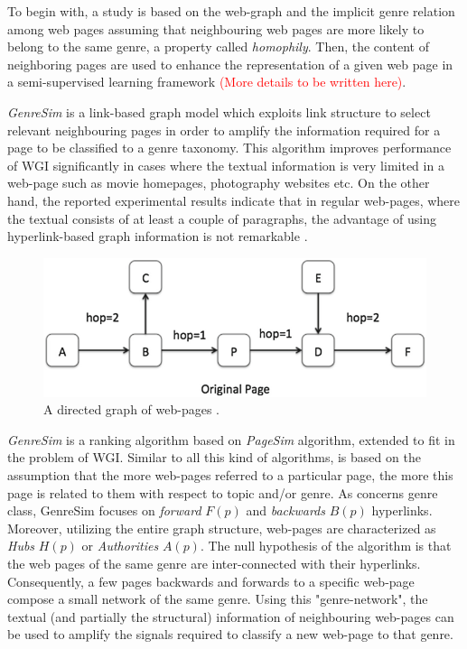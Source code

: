 To begin with, a study is based on the web-graph and the implicit genre relation among web pages assuming that neighbouring web pages are more likely to belong to the same genre, a property called \textit{homophily}. Then, the content of neighboring pages are used to enhance the representation of a given web page in a semi-supervised learning framework \parencite{asheghi2014semi} \textcolor{red}{(More details to be written here)}.

\textit{GenreSim} is a link-based graph model which exploits link structure to select relevant neighbouring pages in order to amplify the information required for a page to be classified to a genre taxonomy. This algorithm improves performance of WGI significantly in cases where the textual information is very limited in a web-page such as movie homepages, photography websites etc. On the other hand, the reported experimental results indicate that in regular web-pages, where the textual consists of at least a couple of paragraphs, the advantage of using hyperlink-based graph information is not remarkable \parencite{zhu2011enhance,zhu2016exploiting}.

\begin{figure}[t]
	\begin{center}
    	\includegraphics[scale=0.95]{Figures/GenreSim_Draw.eps}
		\caption{A directed graph of  web-pages \parencite{zhu2016exploiting}.}
		\label{fig:GenreSim_Draw}
	\end{center}
\end{figure}

\textit{GenreSim} is a ranking algorithm based on \textit{PageSim} algorithm, extended to fit in the problem of WGI. Similar to all this kind of algorithms, is based on the assumption that the more web-pages referred to a particular page, the more this page is related to them with respect to topic and/or genre. As concerns genre class, GenreSim focuses on \textit{forward} $F(p)$ and \textit{backwards} $B(p)$ hyperlinks. Moreover, utilizing the entire graph structure, web-pages are characterized as \textit{Hubs} $H(p)$ or \textit{Authorities} $A(p)$. The null hypothesis of the algorithm is that the web pages of the same genre are inter-connected with their hyperlinks. Consequently, a few pages backwards and forwards to a specific web-page compose a small network of the same genre. Using this "genre-network", the textual (and partially the structural) information of neighbouring web-pages can be used to amplify the signals required to classify a new web-page to that genre.

